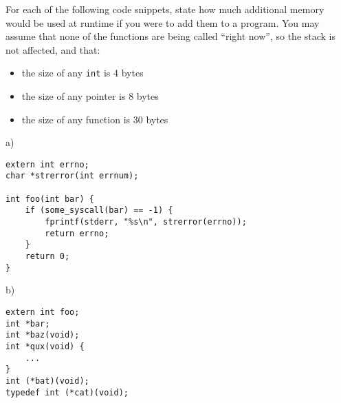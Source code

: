 \documentclass[a4paper,12pt]{article}
\begin{document}
For each of the following code snippets, state how much additional
memory would be used at runtime if you were to add them to a program.
You may assume that none of the functions are being called ``right
now'', so the stack is not affected, and that:

\begin{itemize}
	\item the size of any \texttt{int} is 4 bytes
	\item the size of any pointer is 8 bytes
	\item the size of any function is 30 bytes
\end{itemize}

a) %

\begin{lstlisting}
extern int errno;
char *strerror(int errnum);

int foo(int bar) {
	if (some_syscall(bar) == -1) {
		fprintf(stderr, "%s\n", strerror(errno));
		return errno;
	}
	return 0;
}
\end{lstlisting}

b) %

\begin{lstlisting}
extern int foo;
int *bar;
int *baz(void);
int *qux(void) {
	...
}
int (*bat)(void);
typedef int (*cat)(void);
\end{lstlisting}
\end{document}
